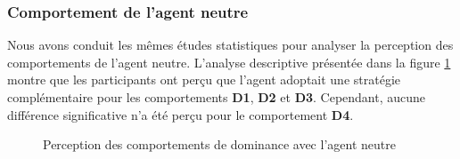 	\subsubsection{Comportement de l'agent neutre}
	
	Nous avons conduit les mêmes études statistiques pour analyser la perception des comportements de l'agent neutre. L'analyse descriptive présentée dans la figure \ref{fig:neutre} montre que les participants ont perçu que l'agent adoptait une stratégie complémentaire pour les comportements \textbf{D1}, \textbf{D2} et \textbf{D3}. Cependant, aucune différence significative n'a été perçu pour le comportement \textbf{D4}.
	
	\begin{figure}[!tb]
		\centering
		
		\caption{Perception des comportements de dominance avec l'agent neutre}
		\label{fig:neutre}
	\end{figure}
	
